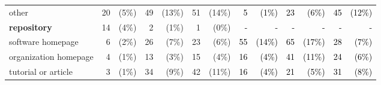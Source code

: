 \documentclass[smallextended]{svjour3}       %
\newcommand{\fix}[1]{\textcolor{black}{#1}}
\begin{document}
\begin{table}[t]
{\begin{tabular}{lr@{}rr@{}rr@{}r|r@{}rr@{}rr@{}r}
other                                  & 20                            & (5\%)                             & 49                            & (13\%)                            & 51                            & (14\%)                            & \fix{ 5}                             & \fix{ (1\%)}                             & \fix{ 23}                            & \fix{ (6\%)}                             & \fix{ 45}                            & \fix{ (12\%)}                            \\
\textbf{repository}   & 14                            & (4\%)                             & 2                             & (1\%)                             & 1                             & (0\%)                             & \fix{ -}                             & \fix{ -}                                 & \fix{ -}                             & \fix{ -}                                 & \fix{ -}                             & \fix{ -}                                 \\
software homepage                      & 6                             & (2\%)                             & 26                            & (7\%)                             & 23                            & (6\%)                             & \fix{ 55}                            & \fix{ (14\%)}                            & \fix{ 65}                            & \fix{ (17\%)}                            & \fix{ 28}                            & \fix{ (7\%)}                             \\
organization homepage                  & 4                             & (1\%)                             & 13                            & (3\%)                             & 15                            & (4\%)                             & \fix{ 16}                            & \fix{ (4\%)}                             & \fix{ 41}                            & \fix{ (11\%)}                            & \fix{ 24}                            & \fix{ (6\%)}                             \\
tutorial or article                    & 3                             & (1\%)                             & 34                            & (9\%)                             & 42                            & (11\%)                            & \fix{ 16}                            & \fix{ (4\%)}                             & \fix{ 21}                            & \fix{ (5\%)}                             & \fix{ 31}                            & \fix{ (8\%)}                             \\

\end{tabular}}
\end{table}
\end{document}
